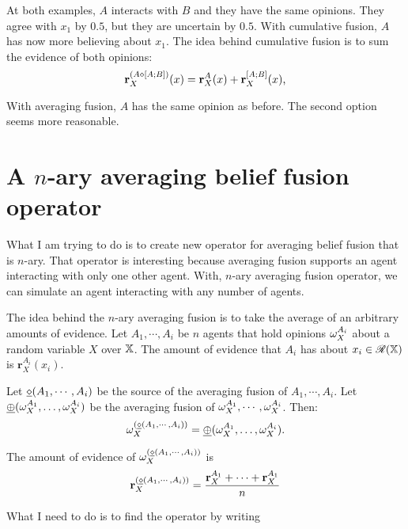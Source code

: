 \documentclass[a4paper,12pt]{article}
\theoremstyle{definition}
\theoremstyle{theorem}
\numberwithin{equation}{section}
\begin{document}
At both examples, $A$ interacts with $B$ and they have the same opinions. They agree with $x_1$ by $0.5$, but they are uncertain by $0.5$. With cumulative fusion, $A$ has now more believing about $x_1$. The idea behind cumulative fusion is to sum the evidence of both opinions:
\begin{equation}
\mathbf{r}^{(A \diamond [A; B])}_X(x) = \mathbf{r}^A_X(x) + \mathbf{r}^{[A; B]}_X(x) \text{,}
\end{equation}

With averaging fusion, $A$ has the same opinion as before. The second option seems more reasonable.





\section{A $n$-ary averaging belief fusion operator}

What I am trying to do is to create new operator for averaging belief fusion that is $n$-ary. That operator is interesting because averaging fusion supports an agent interacting with only one other agent. With, $n$-ary averaging fusion operator, we can simulate an agent interacting with any number of agents.

The idea behind the $n$-ary averaging fusion is to take the average of an arbitrary amounts of evidence. Let $A_1, \cdots, A_i$ be $n$ agents that hold opinions $\omega^{A_i}_{X}$ about a random variable $X$ over $\mathbb{X}$. The amount of evidence that $A_i$ has about $x_i \in \mathcal{R}(\mathbb{X})$ is $\mathbf{r}^{A_i}_X(x_i)$.

Let $\underline{\diamond}(A_1, \cdots, A_i)$ be the source of the averaging fusion of $A_1, \cdots, A_i$. Let $\underline{\oplus}(\omega^{A_1}_{X}, \dots, \omega^{A_i}_{X})$ be the averaging fusion of $\omega^{A_1}_{X}, \cdots, \omega^{A_i}_{X}$. Then:
\begin{equation}
\omega^{(\underline{\diamond}(A_1, \cdots, A_i))}_{X} = \underline{\oplus}(\omega^{A_1}_{X}, \dots, \omega^{A_i}_{X}) \text{.}
\end{equation}

The amount of evidence of $\omega^{(\underline{\diamond}(A_1, \cdots, A_i))}_{X}$ is
\begin{equation}
\mathbf{r}^{(\underline{\diamond}(A_1, \cdots, A_i))}_X = \dfrac{\mathbf{r}^{A_1}_X + \cdots + \mathbf{r}^{A_1}_X}{n} 
\end{equation}

What I need to do is to find the operator by writing
\begin{equation}

\end{equation}





\printbibliography
\end{document}
